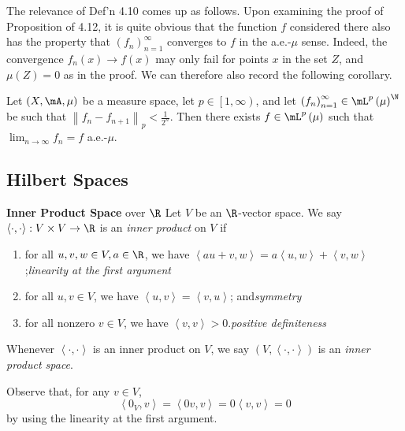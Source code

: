 \documentclass[pmath450]{subfiles}
\begin{document}
    \np The relevance of Def'n 4.10 comes up as follows. Upon examining the proof of Proposition of 4.12, it is quite obvious that the function $f$ considered there also has the property that $\left( f_{n} \right)^{\infty}_{n=1}$ converges to $f$ in the a.e.-$\mu$ sense. Indeed, the convergence $f_n\left( x \right)\to f\left( x \right)$ may only fail for points $x$ in the set $Z$, and $\mu\left( Z \right)=0$ as in the proof. We can therefore also record the following corollary.

    \begin{cor}{}
        Let $\left( X,\mA,\mu \right)$ be a measure space, let $p\in\left[ 1,\infty \right)$, and let $\left( f_{n} \right)^{\infty}_{n=1}\in\lp\left( \mu \right)^{\N}$ be such that $\left\lVert f_n-{f_{n+1}}\right\rVert_p<\frac{1}{2^n}$. Then there exists $f\in\lp\left( \mu \right)$ such that $\lim_{n\to\infty}f_n=f$ a.e.-$\mu$.
    \end{cor}	

    \rruleline
    
    \subsection{Hilbert Spaces}

    \begin{recall}{\textbf{Inner Product Space} over $\R$}
        Let $V$ be an $\R$-vector space. We say $\left\langle \cdot, \cdot\right\rangle:V\times V\to\R$ is an \emph{inner product} on $V$ if
        \begin{enumerate}
            \item for all $u,v,w\in V, a\in\R$, we have $\left\langle au+v, w\right\rangle = a\left\langle u, w\right\rangle+\left\langle v, w\right\rangle$;\hfill\textit{linearity at the first argument}
            \item for all $u,v\in V$, we have $\left\langle u, v\right\rangle=\left\langle v, u\right\rangle$; and\hfill\textit{symmetry}
            \item for all nonzero $v\in V$, we have $\left\langle v, v\right\rangle>0$.\hfill\textit{positive definiteness}
        \end{enumerate}
        Whenever $\left\langle \cdot, \cdot\right\rangle$ is an inner product on $V$, we say $\left( V,\left\langle \cdot, \cdot\right\rangle \right)$ is an \emph{inner product space}.
    \end{recall}
    
    \np Observe that, for any $v\in V$,
    \begin{equation*}
        \left\langle 0_V, v\right\rangle = \left\langle 0v, v\right\rangle = 0\left\langle v, v\right\rangle = 0
    \end{equation*}
    by using the linearity at the first argument.
\end{document}
